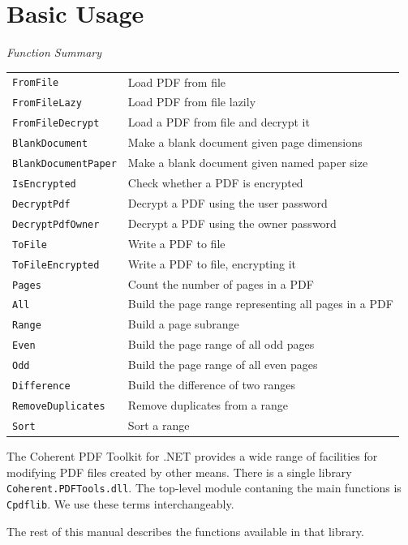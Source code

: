 \documentclass[a4paper]{memoir}
\begin{document}
\chapter{Basic Usage}
\begin{framed}
\noindent\textit{Function Summary}\\[2mm]
\noindent\begin{tabular}{ll}
\verb!FromFile! & Load PDF from file\\
\verb!FromFileLazy! & Load PDF from file lazily\\
\verb!FromFileDecrypt! & Load a PDF from file and decrypt it\\[5mm]
\verb!BlankDocument! & Make a blank document given page dimensions\\
\verb!BlankDocumentPaper! & Make a blank document given named paper size\\[5mm]
\verb!IsEncrypted! & Check whether a PDF is encrypted\\
\verb!DecryptPdf! & Decrypt a PDF using the user password\\
\verb!DecryptPdfOwner! & Decrypt a PDF using the owner password\\[5mm]
\verb!ToFile! & Write a PDF to file\\
\verb!ToFileEncrypted! & Write a PDF to file, encrypting it\\[5mm]
\verb!Pages! & Count the number of pages in a PDF\\[5mm]
\verb!All! & Build the page range representing all pages in a PDF\\
\verb!Range! & Build a page subrange\\
\verb!Even! & Build the page range of all odd pages\\
\verb!Odd! & Build the page range of all even pages\\
\verb!Difference! & Build the difference of two ranges\\
\verb!RemoveDuplicates! & Remove duplicates from a range\\
\verb!Sort! & Sort a range
\end{tabular}
\end{framed}
The Coherent PDF Toolkit for .NET provides a wide range of facilities for
modifying PDF files created by other means. There is a single library
\texttt{Coherent.PDFTools.dll}. The top-level module contaning the main functions is \texttt{Cpdflib}. We use these terms interchangeably.

The rest of this manual describes the functions available in that library.
\end{document}
